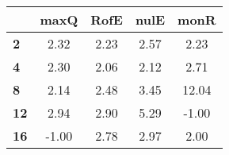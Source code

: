 \begin{tabular}{|l|c|c|c|c|}
\hline
&\textbf{maxQ}&\textbf{RofE}&\textbf{nulE}&\textbf{monR}\\\hline
\textbf{2}&2.32&2.23&2.57&2.23\\\hline
\textbf{4}&2.30&2.06&2.12&2.71\\\hline
\textbf{8}&2.14&2.48&3.45&12.04\\\hline
\textbf{12}&2.94&2.90&5.29&-1.00\\\hline
\textbf{16}&-1.00&2.78&2.97&2.00\\\hline
\end{tabular}
